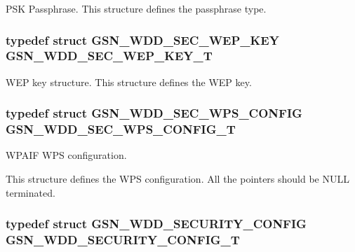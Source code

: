 PSK Passphrase. This structure defines the passphrase type. 

\hypertarget{a00604_ad403eea763b418200b48fca5debb58bd}{
\subsubsection[{GSN\_\-WDD\_\-SEC\_\-WEP\_\-KEY\_\-T}]{\setlength{\rightskip}{0pt plus 5cm}typedef struct {\bf GSN\_\-WDD\_\-SEC\_\-WEP\_\-KEY}  {\bf GSN\_\-WDD\_\-SEC\_\-WEP\_\-KEY\_\-T}}}
\label{a00604_ad403eea763b418200b48fca5debb58bd}


WEP key structure. This structure defines the WEP key. 

\hypertarget{a00604_a3186abec212969b8d5fd2f8c920bdc70}{
\subsubsection[{GSN\_\-WDD\_\-SEC\_\-WPS\_\-CONFIG\_\-T}]{\setlength{\rightskip}{0pt plus 5cm}typedef struct {\bf GSN\_\-WDD\_\-SEC\_\-WPS\_\-CONFIG} {\bf GSN\_\-WDD\_\-SEC\_\-WPS\_\-CONFIG\_\-T}}}
\label{a00604_a3186abec212969b8d5fd2f8c920bdc70}


WPAIF WPS configuration. 

This structure defines the WPS configuration. All the pointers should be NULL terminated. \hypertarget{a00604_ab50f348fec494c964d4301472eee16de}{
\subsubsection[{GSN\_\-WDD\_\-SECURITY\_\-CONFIG\_\-T}]{\setlength{\rightskip}{0pt plus 5cm}typedef struct {\bf GSN\_\-WDD\_\-SECURITY\_\-CONFIG}  {\bf GSN\_\-WDD\_\-SECURITY\_\-CONFIG\_\-T}}}
\label{a00604_ab50f348fec494c964d4301472eee16de}


